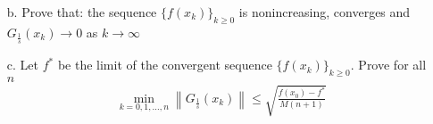 \documentclass{ExerciseSheet}
\newif\ifsolutions
\begin{document}
\begin{problem}
\begin{enumerate}
\begin{itemize}
         \item [b.] Prove that: the sequence $\{f(x_k)\}_{k\geq0}$ is nonincreasing, converges and  $\displaystyle G_{\frac{1}{s}}(x_k)\to 0$ as $k\to \infty$
         \item [c.] Let $f^*$ be the limit of the convergent sequence $\{f(x_k)\}_{k\geq0}.$ Prove for all $n$
           \begin{align*}
               \min_{k=0,1,\dots,n}\left\|G_{\frac{1}{s}}(x_k)\right\|\leq \sqrt{\frac{f(x_0)-f^*}{M(n+1)}}
           \end{align*}
      \end{itemize}
     \end{enumerate}
 
\end{problem}

\ifsolutions
\vskip 0.3cm
\end{document}
